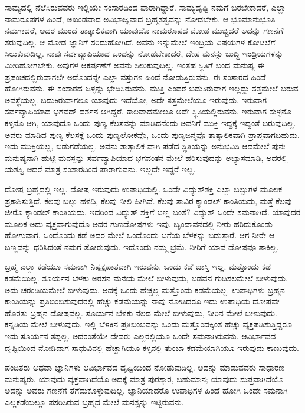 ಸಾಮ್ಯದಲ್ಲಿ ನೆಲೆಸಿರುವವರು ಇಲ್ಲಿಯೇ ಸಂಸಾರದಿಂದ ಪಾರಾಗಿದ್ದಾರೆ. ಸಾಮ್ಯದೃಷ್ಟಿ ನಮಗೆ ಬರಬೇಕಾದರೆ, ಎಲ್ಲಾ ನಾಮರೂಪಗಳ ಹಿಂದೆ, ಅಖಂಡವಾದ ಅವಿಭಾಜ್ಯವಾದ ಬ್ರಹ್ಮತತ್ವವನ್ನು ನೋಡಬೇಕು. ಆ ಭೂಮಾನುಭೂತಿ ನಮಗಾದರೆ, ಅದರ ಮುಂದೆ ತಾತ್ಕಾಲಿಕವಾಗಿ ಯಾವುದೊ ನಾಮರೂಪದ ಮೋಡ ಮುಚ್ಚಿದರೆ ಅದನ್ನು ಗಣನೆಗೆ ತರುವುದಿಲ್ಲ. ಆ ಮೋಡ ಜ್ಞಾನಿಗೆ ಸರಿದುಹೋಗಿದೆ. ಅವನು ಇನ್ನುಮೇಲೆ ಇಂದ್ರಿಯ ವಿಷಯಗಳ ಕೋಟಲೆಗೆ ಸಿಲುಕುವುದಿಲ್ಲ. ನಾವು ಸರ್ವವ್ಯಾಪಿಯಾದ ಒಂದನ್ನು ನೋಡಬೇಕಾದರೆ, ದೇಹ ಮನಸ್ಸು ಬುದ್ಧಿ ಇಂದ್ರಿಯಗಳನ್ನು ಮೀರಿಹೋಗಬೇಕು. ಅವುಗಳ ಆಕರ್ಷಣೆಗೆ ಅವನು ಸಿಲುಕುವುದಿಲ್ಲ. ಇಂತಹ ಸ್ಥಿತಿಗೆ ಬಂದ ಮನುಷ್ಯ ಈ ಪ್ರಪಂಚದಲ್ಲಿರುವಾಗಲೇ ಅದೊಂದನ್ನೇ ಎಲ್ಲಾ ವಸ್ತುಗಳ ಹಿಂದೆ ನೋಡುತ್ತಿರುವನು. ಈ ಸಂಸಾರದ ಹಿಂದೆ ಹೋಗಿರುವನು. ಈ ಸಂಸಾರದ ಜಳ್ಳನ್ನು ಭೇದಿಸಿರುವನು. ಮುಕ್ತಿ ಎಂದರೆ ಬದುಕಿರುವಾಗ ಇಲ್ಲದ್ದು ಸತ್ತಮೇಲೆ ಬರುವ ಅವಸ್ಥೆಯಲ್ಲ. ಬದುಕಿರುವಾಗಲೂ ಯಾವುದು ಇದೆಯೋ, ಅದೇ ಸತ್ತಮೇಲೆಯೂ ಇರುವುದು. ಇರುವಾಗ ಸರ್ವವ್ಯಾಪಿಯಾದ ಭಗವದ್ ದರ್ಶನ ಆಗಿದ್ದರೆ, ಕಾಲವಾದಮೇಲೂ ಅದೇ ಸ್ಥಿತಿಯಲ್ಲಿರುವನು. ಇರುವಾಗ ಸುಳ್ಳನೊ ಕಳ್ಳನೊ ಆಗಿ, ಯಾವುದೊ ಒಂದು ಪುಣ್ಯ ಕೆಲಸವನ್ನು ಮಾಡಿದನೆಂದು ಅವನಿಗೆ ಮುಕ್ತಿ ಇದ್ದಕ್ಕೆ ಇದ್ದಂತೆ ಬರುವುದಿಲ್ಲ. ಅವರು ಮಾಡಿದ ಪುಣ್ಯ ಕೆಲಸಕ್ಕೆ ಒಂದು ಪುಣ್ಯಲೋಕವೊ, ಒಂದು ಪುಣ್ಯಜನ್ಮವೊ ತಾತ್ಕಾಲಿಕವಾಗಿ ಪ್ರಾಪ್ತವಾಗಬಹುದು. ಇದು ಮುಕ್ತಿಯಲ್ಲ, ಬಿಡುಗಡೆಯಲ್ಲ. ಅವನು ತಾತ್ಕಾಲಿಕ ವಾಗಿ ಪಡೆದ ಸ್ಥಿತಿಯನ್ನು ಅನುಭವಿಸಿ ಆದಮೇಲೆ ಪುನಃ ಮನುಷ್ಯನಾಗಿ ಹುಟ್ಟಿ ಮನಸ್ಸನ್ನು ಸರ್ವವ್ಯಾಪಿಯಾದ ಭಗವಂತನ ಮೇಲೆ ಹರಿಸುವುದನ್ನು ಅಭ್ಯಾಸಮಾಡಿ, ಅದರಲ್ಲಿ ಯಶಸ್ವಿ ಆದರೆ ಮಾತ್ರ ಸಂಸಾರದಿಂದ ಪಾರಾಗುವನು. ಇಲ್ಲದೇ ಇದ್ದರೆ ಇಲ್ಲ.

ದೋಷ ಬ್ರಹ್ಮದಲ್ಲಿ ಇಲ್ಲ. ದೋಷ ಇರುವುದು ಉಪಾಧಿಯಲ್ಲಿ. ಒಂದೇ ವಿದ್ಯುತ್​ಶಕ್ತಿ ಎಲ್ಲಾ ಬಲ್ಬುಗಳ ಮೂಲಕ ಪ್ರಕಾಶಿಸುತ್ತಿದೆ. ಕೆಲವು ಬಲ್ಬು ಹಳದಿ, ಕೆಲವು ನೀಲಿ ಹೀಗಿವೆ. ಕೆಲವು ಸಾವಿರ ಕ್ಯಾಂಡಲ್ ಕಾಂತಿಯದು, ಮತ್ತೆ ಕೆಲವು ಜೀರೊ ಕ್ಯಾಂಡಲ್ ಕಾಂತಿಯದು. ಇದರಿಂದ ವಿದ್ಯುತ್ ಶಕ್ತಿಗೆ ಬಣ್ಣ ಬಂತೆ? ವಿದ್ಯುತ್ ಒಂದೇ ಸಮನಾಗಿದೆ. ಯಾವುದರ ಮೂಲಕ ಅದು ವ್ಯಕ್ತವಾಗುವುದೊ ಅದರ ಗುಣದೋಷಗಳು ಇವು. ಬೃಂದಾವನದಲ್ಲಿ ನೀರು ಹರಿದುಕೊಂಡು ಹೋಗುವಾಗ, ಒಂದೊಂದು ಕಡೆ ಅದರ ಮೇಲೆ ಒಂದೊಂದು ಬಗೆಯ ಬೆಳಕನ್ನು ಬಿಡುತ್ತಾರೆ. ಆಗ ನೀರೇ ಆ ಬಣ್ಣವನ್ನು ಧರಿಸಿದಂತೆ ನಮಗೆ ತೋರುವುದು. ಇದೊಂದು ನಮ್ಮ ಭ್ರಮೆ. ನೀರಿಗೆ ಯಾವ ದೋಷವೂ ತಾಕಿಲ್ಲ.

ಬ್ರಹ್ಮ ಎಲ್ಲಾ ಕಡೆಯೂ ಸಮನಾಗಿ ನಿಷ್ಪಕ್ಷಪಾತವಾಗಿ ಇರುವನು. ಒಂದು ಕಡೆ ಜಾಸ್ತಿ ಇಲ್ಲ. ಮತ್ತೊಂದು ಕಡೆ ಕಡಮೆಯಿಲ್ಲ. ಸೂರ್ಯನ ಬೆಳಕು ಅರಸನ ಮನೆಯ ಮೇಲೆ ಬೀಳುವುದು, ಬಡವನ ಗುಡಿಸಲಮೇಲೆ ಬೀಳುವುದು. ಅದು ಚರಂಡಿಯಮೇಲೆ ಬೀಳುವುದು. ಅದಕ್ಕೆ ಒಂದು ಹೆಚ್ಚಲ್ಲ ಮತ್ತೊಂದು ಕಡಮೆಯಲ್ಲ. ಉಪಾಧಿಗಳು ಬ್ರಹ್ಮನ ಕಾಂತಿಯನ್ನು ಪ್ರತಿಬಿಂಬಿಸುವುದರಲ್ಲಿ ಹೆಚ್ಚು ಕಡಮೆಯನ್ನು ನಾವು ನೋಡಿದರೂ ಇದು ಉಪಾಧಿಯ ದೋಷವೇ ಹೊರತು ಬ್ರಹ್ಮನ ದೋಷವಲ್ಲ. ಸೂರ್ಯನ ಬೆಳಕು ನೆಲದ ಮೇಲೆ ಬೀಳುವುದು, ನೀರಿನ ಮೇಲೆ ಬೀಳುವುದು. ಕನ್ನಡಿಯ ಮೇಲೆ ಬೀಳುವುದು. ಇಲ್ಲಿ ಬೆಳಕಿನ ಪ್ರತಿಬಿಂಬವನ್ನು ಒಂದು ಮತ್ತೊಂದಕ್ಕಿಂತ ಹೆಚ್ಚು ವ್ಯಕ್ತಪಡಿಸುತ್ತಿದ್ದರೂ ಇದು ಸೂರ್ಯನ ತಪ್ಪಲ್ಲ. ಅದರಂತೆಯೇ ದೇವರು ಎಲ್ಲರಲ್ಲಿಯೂ ಒಂದೇ ಸಮನಾಗಿರುವನು. ಆವಿರ್ಭಾವದ ದೃಷ್ಟಿಯಿಂದ ನೋಡಿದಾಗ ಸಾಧುವಿನಲ್ಲಿ ಹೆಚ್ಚಾಗಿಯೂ ಕಳ್ಳನಲ್ಲಿ ತುಂಬಾ ಕಡಮೆಯಾಗಿಯೂ ಇರುವುದು ಕಾಣುವುದು.

ಪಂಡಿತರು ಅಥವಾ ಜ್ಞಾನಿಗಳು ಆವಿರ್ಭಾವದ ದೃಷ್ಟಿಯಿಂದ ನೋಡುವುದಿಲ್ಲ. ಅದನ್ನು ಮಾಡುವವರು ಸಾಧಾರಣ ಮನುಷ್ಯರು. ಯಾವುದು ವ್ಯಕ್ತವಾಗಿದೆಯೊ ಅದಕ್ಕೆ ಮಾತ್ರ ಪುರಸ್ಕಾರ, ಬಹುಮಾನ; ಯಾವುದು ಸುಪ್ತವಾಗಿದೆಯೊ ಅದನ್ನು ಅವರು ಗಣನೆಗೆ ತೆಗೆದುಕೊಳ್ಳುವುದಿಲ್ಲ. ಜ್ಞಾನಿಯಾದರೊ ಉಪಾಧಿಗಳ ಹಿಂದೆ ಹೋಗಿ ಒಂದೇ ಸಮನಾಗಿ ಎಲ್ಲಕಡೆಯಲ್ಲೂ ಪಸರಿಸಿರುವ ಬ್ರಹ್ಮದ ಮೇಲೆ ಮನಸ್ಸನ್ನು ಇಟ್ಟಿರುವನು.

